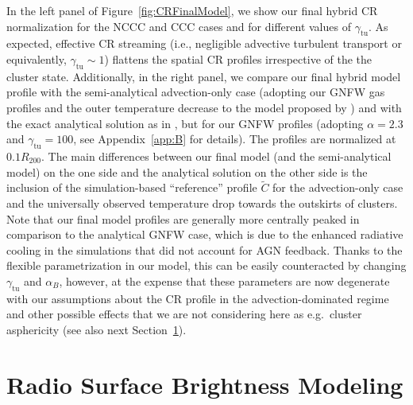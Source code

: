 \documentclass[traditabstract]{aa}
\newcommand{\rmn}{\mathrm}
\begin{document}
In the left panel of Figure~\ref{fig:CRFinalModel}, we show our final hybrid CR 
normalization for the NCCC and CCC cases and for different values of $\gamma_{\rmn{tu}}$. 
As expected, effective CR streaming (i.e., negligible advective turbulent transport
or equivalently, $\gamma_{\rmn{tu}}\sim1$) flattens the spatial CR profiles
irrespective of the the cluster state. Additionally, in the right panel, we
compare our final hybrid model profile with the
semi-analytical advection-only case (adopting our GNFW gas profiles and the
outer temperature decrease to the model proposed by \citealp{2010MNRAS.409..449P})
and with the exact analytical solution as in \citet{2011A&A...527A..99E}, but
for our GNFW profiles (adopting $\alpha=2.3$ and $\gamma_{\rmn{tu}}=100$, see
Appendix~\ref{app:B} for details).  The profiles are normalized at $0.1 R_{200}$. 
The main differences between our final model (and the semi-analytical
model) on the one side and the analytical solution on the other side is the
inclusion of the simulation-based ``reference'' profile $\tilde{C}$ for the
advection-only case and the universally observed temperature drop towards the
outskirts of clusters. Note that our final model profiles
are generally more centrally peaked in comparison to the analytical GNFW case,
which is due to the enhanced radiative cooling in the \citet{2010MNRAS.409..449P} 
simulations that did not account for AGN feedback. Thanks to the
flexible parametrization in our model, this can be easily counteracted by
changing $\gamma_{\rmn{tu}}$ and $\alpha_B$, however, at the expense that these
parameters are now degenerate with our assumptions about the CR profile in the
advection-dominated regime and other possible effects that we are not considering 
here as e.g.~cluster asphericity (see also next Section~\ref{sec:3}).


\section{Radio Surface Brightness Modeling}
\label{sec:3}
\end{document}
